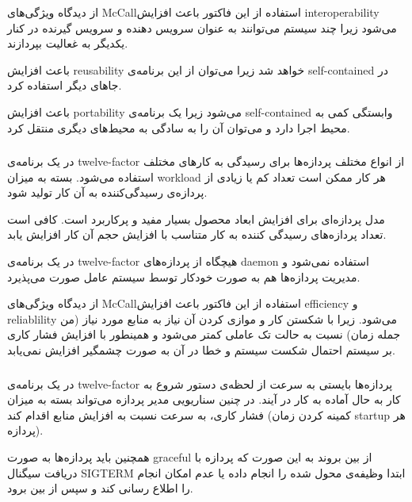 از دیدگاه ویژگی‌های McCallاستفاده از این فاکتور باعث افزایش interoperability می‌شود زیرا چند سیستم می‌توانند به عنوان سرویس دهنده و سرویس گیرنده در کنار یکدیگر به غعالیت بپردازند.

باعث افزایش reusability خواهد شد زیرا می‌توان از این برنامه‌ی self-contained در جاهای دیگر استفاده کرد.

باعث افزایش portability می‌شود زیرا یک برنامه‌ی self-contained وابستگی کمی به محیط اجرا دارد و می‌توان آن را به سادگی به محیط‌های دیگری منتقل کرد.

\subsubsection{}

در یک برنامه‌ی 
twelve-factor
از انواع مختلف پردازه‌ها برای رسیدگی به کار‌های مختلف استفاده می‌شود. بسته به میزان workload هر کار ممکن است تعداد کم یا زیادی از پردازه‌ی رسیدگی‌کننده به آن کار تولید شود.

مدل پردازه‌ای برای افزایش ابعاد محصول بسیار مفید و پرکاربرد است. کافی است تعداد پردازه‌های رسیدگی کننده به کار متناسب با افزایش حجم آن کار افزایش یابد.

در  یک برنامه‌ی
twelve-factor
هیچگاه از پردازه‌های daemon استفاده نمی‌شود و مدیریت پردازه‌ها هم به صورت خودکار توسط سیستم عامل صورت می‌پذیرد.


از دیدگاه ویژگی‌های McCallاستفاده از این فاکتور باعث افزایش efficiency و reliablility می‌شود. زیرا با شکستن کار و موازی کردن آن نیاز به منابع مورد نیاز (من جمله زمان) نسبت به حالت تک عاملی کمتر می‌شود و همینطور با افزایش فشار کاری بر سیستم احتمال شکست سیستم و خطا در آن به صورت چشمگیر افزایش نمی‌یابد.



\subsubsection{}

در یک برنامه‌ی twelve-factor پردازه‌ها بایستی به سرعت از لحظه‌ی دستور شروع به کار به حال آماده به کار در آیند. در چنین سناریو‌یی مدیر پردازه می‌تواند بسته به میزان فشار کاری، به سرعت نسبت به افزایش منابع اقدام کند (کمینه کردن زمان startup هر پردازه).

همچنین باید پردازه‌ها به صورت graceful از بین بروند به این صورت که پردازه با دریافت سیگنال
SIGTERM ابتدا وظیفه‌ی محول شده را انجام داده یا عدم امکان انجام را اطلاع رسانی کند و سپس از بین برود.

